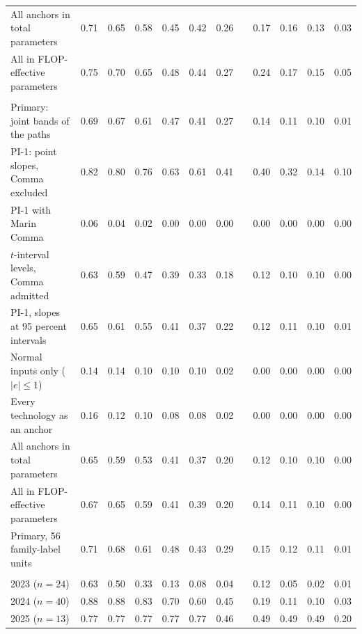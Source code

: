 \begin{table}[tp]
\begin{tabular*}{\textwidth}{@{\extracolsep{\fill}}lrrrrrrcrrrr@{}}
All anchors in total parameters & 0.71 & 0.65 & 0.58 & 0.45 & 0.42 & 0.26 & & 0.17 & 0.16 & 0.13 & 0.03 \\
All in FLOP-effective parameters & 0.75 & 0.70 & 0.65 & 0.48 & 0.44 & 0.27 & & 0.24 & 0.17 & 0.15 & 0.05 \\
\addlinespace[2pt]
\multicolumn{12}{@{}l}{\textit{Panel B. Allocation decisions (49)}} \\
Primary: joint bands of the paths & 0.69 & 0.67 & 0.61 & 0.47 & 0.41 & 0.27 & & 0.14 & 0.11 & 0.10 & 0.01 \\
PI-1: point slopes, Comma excluded & 0.82 & 0.80 & 0.76 & 0.63 & 0.61 & 0.41 & & 0.40 & 0.32 & 0.14 & 0.10 \\
\quad PI-1 with Marin Comma & 0.06 & 0.04 & 0.02 & 0.00 & 0.00 & 0.00 & & 0.00 & 0.00 & 0.00 & 0.00 \\
$t$-interval levels, Comma admitted & 0.63 & 0.59 & 0.47 & 0.39 & 0.33 & 0.18 & & 0.12 & 0.10 & 0.10 & 0.00 \\
PI-1, slopes at 95 percent intervals & 0.65 & 0.61 & 0.55 & 0.41 & 0.37 & 0.22 & & 0.12 & 0.11 & 0.10 & 0.01 \\
Normal inputs only ($|e|\le1$) & 0.14 & 0.14 & 0.10 & 0.10 & 0.10 & 0.02 & & 0.00 & 0.00 & 0.00 & 0.00 \\
Every technology as an anchor & 0.16 & 0.12 & 0.10 & 0.08 & 0.08 & 0.02 & & 0.00 & 0.00 & 0.00 & 0.00 \\
All anchors in total parameters & 0.65 & 0.59 & 0.53 & 0.41 & 0.37 & 0.20 & & 0.12 & 0.10 & 0.10 & 0.00 \\
All in FLOP-effective parameters & 0.67 & 0.65 & 0.59 & 0.41 & 0.39 & 0.20 & & 0.14 & 0.11 & 0.10 & 0.00 \\
\quad Primary, 56 family-label units & 0.71 & 0.68 & 0.61 & 0.48 & 0.43 & 0.29 & & 0.15 & 0.12 & 0.11 & 0.01 \\
\addlinespace[2pt]
\multicolumn{12}{@{}l}{\textit{Panel C. Primary, by release year (models)}} \\
2023 ($n=24$) & 0.63 & 0.50 & 0.33 & 0.13 & 0.08 & 0.04 & & 0.12 & 0.05 & 0.02 & 0.01 \\
2024 ($n=40$) & 0.88 & 0.88 & 0.83 & 0.70 & 0.60 & 0.45 & & 0.19 & 0.11 & 0.10 & 0.03 \\
2025 ($n=13$) & 0.77 & 0.77 & 0.77 & 0.77 & 0.77 & 0.46 & & 0.49 & 0.49 & 0.49 & 0.20 \\
\bottomrule
\end{tabular*}
\par\smallskip
\begin{tablenotes}

\end{tablenotes}
\end{table}
